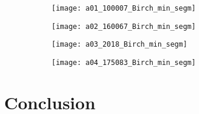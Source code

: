 \begin{figure}[!ht]
    
    \begin{subfigure}[t]{\textwidth+20pt\relax}
    	\centering
    	\texttt{[image: a01\_100007\_Birch\_min\_segm]} 
    \end{subfigure}      
    \begin{subfigure}[b]{0.23\textwidth}
    	\centering
        \texttt{[image: a02\_160067\_Birch\_min\_segm]}
    \end{subfigure}
    \begin{subfigure}[b]{0.23\textwidth}
    	\centering
        \texttt{[image: a03\_2018\_Birch\_min\_segm]}
    \end{subfigure}
    \begin{subfigure}[b]{0.23\textwidth}
    	\centering
        \texttt{[image: a04\_175083\_Birch\_min\_segm]}
    \end{subfigure} 
    
	\caption{}\label{fig:}    
\end{figure}

\section{Conclusion}
